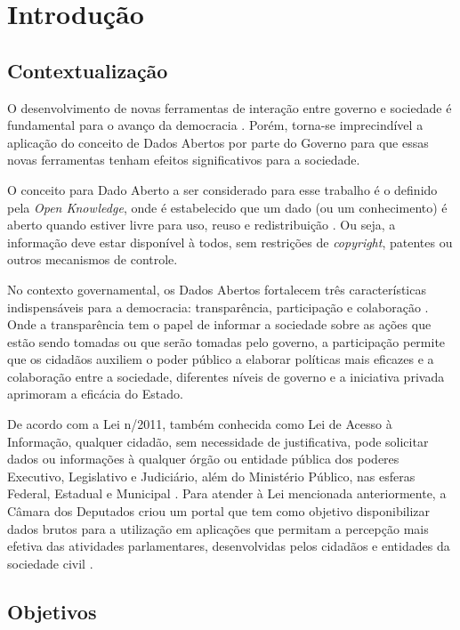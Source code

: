 \chapter*[Introdução]{Introdução}


\section{Contextualização}
\label{sec:contextualização}

O desenvolvimento de novas ferramentas de interação entre governo e sociedade é fundamental para o avanço da democracia \cite{consegi2011}. Porém, torna-se imprecindível a aplicação do conceito de Dados Abertos por parte do Governo para que essas novas ferramentas tenham efeitos significativos para a sociedade.

O conceito para Dado Aberto a ser considerado para esse trabalho é o definido pela \textit{Open Knowledge}, onde é estabelecido que um dado (ou um conhecimento) é aberto quando estiver livre para uso, reuso e redistribuição \cite{open_knowledge}. Ou seja, a informação deve estar disponível à todos, sem restrições de \textit{copyright}, patentes ou outros mecanismos de controle.

No contexto governamental, os Dados Abertos fortalecem três características indispensáveis para a democracia: transparência, participação e colaboração \cite{consegi2011}. Onde a transparência tem o papel de informar a sociedade sobre as ações que estão sendo tomadas ou que serão tomadas pelo governo, a participação permite que os cidadãos auxiliem o poder público a elaborar políticas mais eficazes e a colaboração entre a sociedade, diferentes níveis de governo e a iniciativa privada aprimoram a eficácia do Estado.

De acordo com a Lei n/2011, também conhecida como Lei de Acesso à Informação, qualquer cidadão, sem necessidade de justificativa, pode solicitar dados ou informações à qualquer órgão ou entidade pública dos poderes Executivo, Legislativo e Judiciário, além do Ministério Público, nas esferas Federal, Estadual e Municipal \cite{lei_acesso_informacao}. Para atender à Lei mencionada anteriormente, a Câmara dos Deputados criou um portal que tem como objetivo disponibilizar dados brutos para a utilização em aplicações que permitam a percepção mais efetiva das atividades parlamentares, desenvolvidas pelos cidadãos e entidades da sociedade civil \cite{camara_dados_abertos}.

\section{Objetivos}
\label{sec:objetivos}


